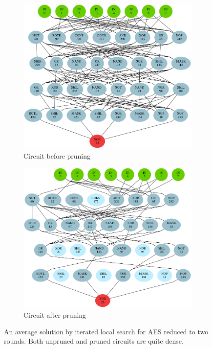 \documentclass[
  print, %
  Table,   %
  nolof,     %
  nolot,     %
  11pt, %
  oneside  %
]{fithesis3}
\begin{document}
\begin{figure}
\begin{changemargin}{-3cm}{-3cm}
\centering
\begin{subfigure}{.6\textwidth}
  \centering
  \includegraphics[width=.98\textwidth]{./graphics/ils/circuit.png}
  \caption{Circuit before pruning}
  \label{fig:ils-circuit-unpruned}
\end{subfigure}%
\begin{subfigure}{.6\textwidth}
  \centering
  \includegraphics[width=.98\textwidth]{./graphics/ils/pruned.png}
  \caption{Circuit after pruning}
  \label{fig:ils-circuit-pruned}
\end{subfigure}
\end{changemargin}
\caption{An average solution by iterated local search for AES reduced to two rounds. Both unpruned and pruned circuits are quite dense.}
\label{fig:ils-circuits}
\end{figure}
\end{document}
